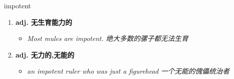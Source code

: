 
\begin{frame}
{\huge impotent}
\begin{center}
\begin{enumerate}\Large
  \item \textbf{adj. 无生育能力的}
  \begin{itemize}
    \item \em{\Large{Most mules are impotent. 绝大多数的骡子都无法生育}}
  \end{itemize}
  \item \textbf{adj. 无力的,无能的}
  \begin{itemize}
    \item \em{\Large{an impotent ruler who was just a figurehead 一个无能的傀儡统治者}}
  \end{itemize}
\end{enumerate}
\end{center}
\end{frame}
